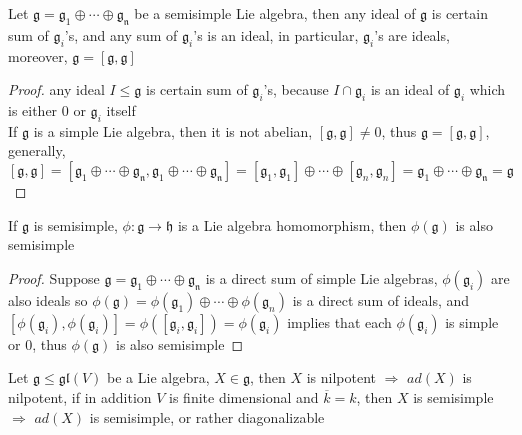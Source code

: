 \documentclass[main]{subfiles}
\begin{document}
\begin{proposition}\label{g simple implies [g,g]=g}
Let $\mathfrak{g}=\mathfrak{g_1}\oplus\cdots\oplus\mathfrak{g_n}$ be a semisimple Lie algebra, then any ideal of $\mathfrak{g}$ is certain sum of $\mathfrak{g}_i$'s, and any sum of $\mathfrak{g}_i$'s is an ideal, in particular,  $\mathfrak{g}_i$'s are ideals, moreover,  $\mathfrak{g}=[\mathfrak{g},\mathfrak{g}]$
\end{proposition}

\begin{proof}
any ideal $I\leq\mathfrak{g}$ is certain sum of $\mathfrak{g}_i$'s, because $I\cap\mathfrak{g}_i$ is an ideal of $\mathfrak{g}_i$ which is either $0$ or $\mathfrak{g}_i$ itself \\
If $\mathfrak{g}$ is a simple Lie algebra, then it is not abelian, $[\mathfrak{g},\mathfrak{g}]\neq0$, thus $\mathfrak{g}=[\mathfrak{g},\mathfrak{g}]$, generally, $[\mathfrak{g},\mathfrak{g}]=[\mathfrak{g_1}\oplus\cdots\oplus\mathfrak{g_n},\mathfrak{g_1}\oplus\cdots\oplus\mathfrak{g_n}]=[\mathfrak{g}_1,\mathfrak{g}_1]\oplus\cdots\oplus[\mathfrak{g}_n,\mathfrak{g}_n]=\mathfrak{g_1}\oplus\cdots\oplus\mathfrak{g_n}=\mathfrak{g}$
\end{proof}

\begin{proposition}\label{image of a semisimple Lie algebra is also semisimple}
If $\mathfrak{g}$ is semisimple, $\phi:\mathfrak{g}\to\mathfrak{h}$ is a Lie algebra homomorphism, then $\phi(\mathfrak{g})$ is also semisimple
\end{proposition}

\begin{proof}
Suppose $\mathfrak{g}=\mathfrak{g_1}\oplus\cdots\oplus\mathfrak{g_n}$ is a direct sum of simple Lie algebras, $\phi(\mathfrak{g}_i)$ are also ideals so $\phi(\mathfrak{g})=\phi(\mathfrak{g}_1)\oplus\cdots\oplus\phi(\mathfrak{g}_n)$ is a direct sum of ideals, and $[\phi(\mathfrak{g}_i),\phi(\mathfrak{g}_i)]=\phi([\mathfrak{g}_i,\mathfrak{g}_i])=\phi(\mathfrak{g}_i)$ implies that each $\phi(\mathfrak{g}_i)$ is simple or $0$, thus $\phi(\mathfrak{g})$ is also semisimple
\end{proof}

\begin{proposition}\label{nilpotent/semisimple implies ad-nilpotent/ad-semisimple}
Let $\mathfrak{g}\leq\mathfrak{gl}(V)$ be a Lie algebra, $X\in\mathfrak{g}$, then $X$ is nilpotent $\Rightarrow$ $ad(X)$ is nilpotent, if in addition $V$ is finite dimensional and $\overline{k}=k$, then $X$ is semisimple $\Rightarrow$ $ad(X)$ is semisimple, or rather diagonalizable
\end{proposition}
\end{document}
